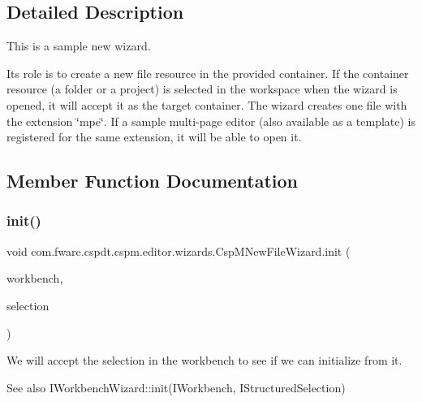\subsection{Detailed Description}
This is a sample new wizard. 

Its role is to create a new file resource in the provided container. If the container resource (a folder or a project) is selected in the workspace when the wizard is opened, it will accept it as the target container. The wizard creates one file with the extension \char`\"{}mpe\char`\"{}. If a sample multi-\/page editor (also available as a template) is registered for the same extension, it will be able to open it. 

\subsection{Member Function Documentation}
\mbox{\label{classcom_1_1fware_1_1cspdt_1_1cspm_1_1editor_1_1wizards_1_1_csp_m_new_file_wizard_a0ec12d138963ca85e6f709a5e45eeb81}} 
\subsubsection{\texorpdfstring{init()}{init()}}
{\footnotesize\ttfamily void com.\+fware.\+cspdt.\+cspm.\+editor.\+wizards.\+Csp\+M\+New\+File\+Wizard.\+init (\begin{DoxyParamCaption}\item[{I\+Workbench}]{workbench,  }\item[{I\+Structured\+Selection}]{selection }\end{DoxyParamCaption})\hspace{0.3cm}{\ttfamily [inline]}}



We will accept the selection in the workbench to see if we can initialize from it. 

\begin{DoxySeeAlso}{See also}
I\+Workbench\+Wizard\+::init(\+I\+Workbench, I\+Structured\+Selection) 
\end{DoxySeeAlso}
\mbox{\label{classcom_1_1fware_1_1cspdt_1_1cspm_1_1editor_1_1wizards_1_1_csp_m_new_file_wizard_a83fd26a7b1d353930d84a355aa267dfd}} 
